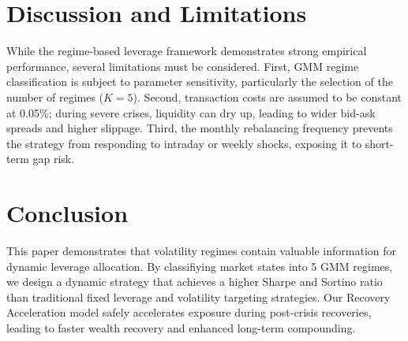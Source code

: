 \documentclass[11pt]{article}
\begin{document}
\section{Discussion and Limitations}
While the regime-based leverage framework demonstrates strong empirical performance, several limitations must be considered. First, GMM regime classification is subject to parameter sensitivity, particularly the selection of the number of regimes ($K=5$). Second, transaction costs are assumed to be constant at 0.05\%; during severe crises, liquidity can dry up, leading to wider bid-ask spreads and higher slippage. Third, the monthly rebalancing frequency prevents the strategy from responding to intraday or weekly shocks, exposing it to short-term gap risk.

\section{Conclusion}
This paper demonstrates that volatility regimes contain valuable information for dynamic leverage allocation. By classifiying market states into 5 GMM regimes, we design a dynamic strategy that achieves a higher Sharpe and Sortino ratio than traditional fixed leverage and volatility targeting strategies. Our Recovery Acceleration model safely accelerates exposure during post-crisis recoveries, leading to faster wealth recovery and enhanced long-term compounding.



\end{document}
